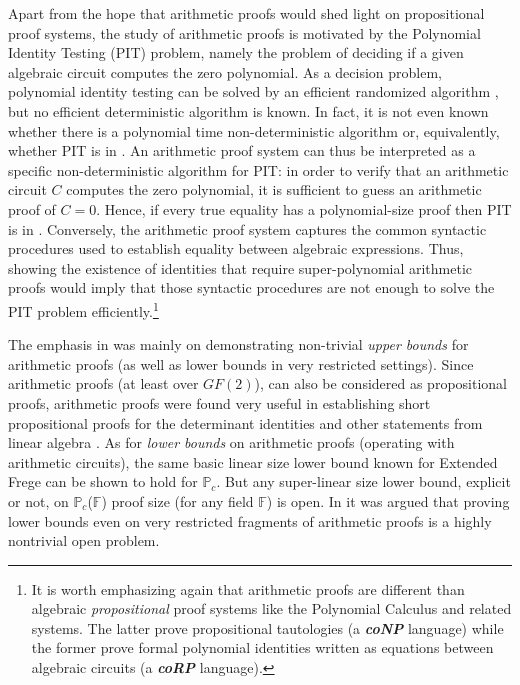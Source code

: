 \documentclass[12pt,reqno]{article}
\newcommand\F{\ensuremath{\mathbb F}}
\newcommand\PP{{\mathbb P}}
\newcommand\PC{\ensuremath{\PP_c}}
\begin{document}
Apart from the hope that arithmetic proofs would shed light on propositional proof systems, the study of arithmetic proofs is motivated by the Polynomial Identity Testing (PIT) problem, namely the problem of deciding if a given algebraic circuit computes the zero polynomial. As a decision problem, polynomial identity testing can be solved by an efficient randomized algorithm \cite{Sch80,Zip79}, but no efficient deterministic algorithm is known. In fact, it is not even known whether there is a polynomial time non-deterministic algorithm or, equivalently, whether  PIT is in \NP. An arithmetic  proof system can thus be interpreted as a specific non-deterministic algorithm for PIT: in order to verify that an arithmetic circuit $C$ computes the zero polynomial, it is sufficient to guess an arithmetic  proof of $C=0$.  Hence, if every true equality has a polynomial-size proof then PIT is in \NP. Conversely, the arithmetic proof system captures the common syntactic procedures used to establish equality between algebraic expressions. Thus, showing the existence of identities that require super-polynomial arithmetic proofs would imply that those syntactic procedures are not enough to solve the PIT problem efficiently.\footnote{It is worth emphasizing again that arithmetic proofs are different than algebraic \textit{propositional} proof systems like the Polynomial Calculus \cite{CEI96} and related systems. The latter prove propositional tautologies (a \textit{\textbf{coNP}} language) while the former prove formal polynomial identities written as equations between algebraic circuits (a \textit{\textbf{coRP}} language).}

The emphasis in \cite{HT08,HT12} was mainly on demonstrating non-trivial  \textit{upper bounds} for arithmetic proofs (as well as lower bounds in very restricted settings). Since arithmetic proofs (at least over $GF(2)$), can also be considered  as propositional proofs,  arithmetic proofs were found very useful in establishing short propositional proofs for the determinant identities and other statements from linear algebra \cite{HT12}. As for \textit{lower bounds }on arithmetic proofs (operating with arithmetic circuits),  the same basic linear size lower bound known for Extended Frege \cite{Kra95} can be shown to hold for $\PC$. But any super-linear size lower bound, explicit or not, on \PC(\F) proof size (for any field \F) is open. In  \cite{HT08} it was argued that proving lower bounds even on very restricted fragments of arithmetic proofs is a highly nontrivial open problem.
\end{document}
